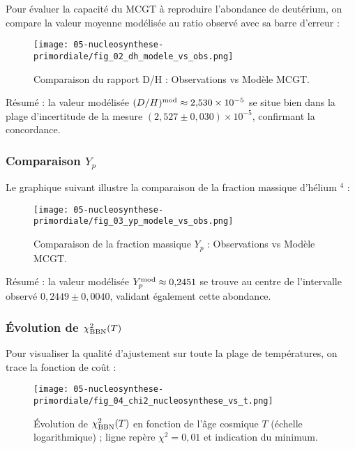 Pour évaluer la capacité du MCGT à reproduire l’abondance de deutérium, on compare la valeur moyenne modélisée au ratio observé avec sa barre d’erreur :

\begin{figure}[htbp]
  \centering
  \texttt{[image: 05-nucleosynthese-primordiale/fig\_02\_dh\_modele\_vs\_obs.png]}
  \caption{Comparaison du rapport D/H : Observations vs Modèle MCGT.}
  \label{fig:nucleosynthese_dh_modele_vs_obs}
\end{figure}

{\small Résumé : la valeur modélisée \((D/H)^{\rm mod}\approx2{,}530\times10^{-5}\) se situe bien dans la plage d’incertitude de la mesure \((2{,}527\pm0{,}030)\times10^{-5}\), confirmant la concordance.}

\subsubsection*{Comparaison \(Y_{p}\)}

Le graphique suivant illustre la comparaison de la fraction massique d’hélium \(^4\) :

\begin{figure}[htbp]
  \centering
  \texttt{[image: 05-nucleosynthese-primordiale/fig\_03\_yp\_modele\_vs\_obs.png]}
  \caption{Comparaison de la fraction massique \(Y_{p}\) : Observations vs Modèle MCGT.}
  \label{fig:nucleosynthese_yp_modele_vs_obs}
\end{figure}

{\small Résumé : la valeur modélisée \(Y_{p}^{\rm mod}\approx0{,}2451\) se trouve au centre de l’intervalle observé \(0{,}2449\pm0{,}0040\), validant également cette abondance.}

\subsubsection*{Évolution de \(\chi^2_{\rm BBN}(T)\)}

Pour visualiser la qualité d’ajustement sur toute la plage de températures, on trace la fonction de coût :

\begin{figure}[htbp]
  \centering
  \texttt{[image: 05-nucleosynthese-primordiale/fig\_04\_chi2\_nucleosynthese\_vs\_t.png]}
  \caption{Évolution de \(\chi^2_{\rm BBN}(T)\) en fonction de l’âge cosmique \(T\) (échelle logarithmique) ; ligne repère \(\chi^{2}=0{,}01\) et indication du minimum.}
  \label{fig:chi2_nucleosynthese_vs_t}
\end{figure}

